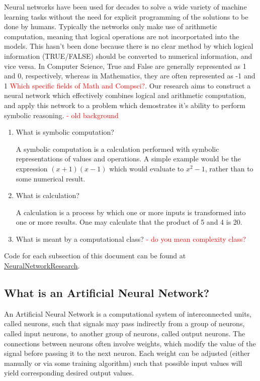 \documentclass{article}
\begin{document}
	Neural networks have been used for decades to solve a wide variety of machine learning tasks without the need for explicit programming of the solutions to be done by humans. Typically the networks only make use of arithmetic computation, meaning that logical operations are not incorportated into the models. This hasn't been done because there is no clear method by which logical information (TRUE/FALSE) should be converted to numerical information, and vice versa. In Computer Science, True and False are generally represented as 1 and 0, respectively, whereas in Mathematics, they are often represented as -1 and 1 \textcolor{red}{Which specific fields of Math and Compsci?}. Our research aims to construct a neural network which effectively combines logical and arithmetic computation, and apply this network to a problem which demostrates it's ability to perform symbolic reasoning.
	\textcolor{red} {- old background} \\
	
	\begin{enumerate}
		\item What is symbolic computation?
		
		A symbolic computation is a calculation performed with symbolic representations of values and operations. A simple example would be the expression $(x + 1)(x - 1)$ which would evaluate to $x^2 - 1$, rather than to some numerical result.
		
		\item What is calculation?
		
		A calculation is a process by which one or more inputs is transformed into one or more results. One may calculate that the product of 5 and 4 is 20.
		
		\item What is meant by a computational class? \textcolor{red}{- do you mean complexity class?}
		
		
	\end{enumerate}
	
	Code for each subsection of this document can be found at \href{https://github.com/DariusBxsci/NeuralNetworkResearch/tree/master/NeuralNets}{NeuralNetworkResearch}. 
	
	\subsection{What is an Artificial Neural Network?}
	
		An Artificial Neural Network is a computational system of interconnected units, called neurons, such that signals may pass indirectly from a group of neurons, called input neurons, to another group of neurons, called output neurons. The connections between neurons often involve weights, which modify the value of the signal before passing it to the next neuron. Each weight can be adjusted (either manually or via some training algorithm) such that possible input values will yield corresponding desired output values.
	
\end{document}
